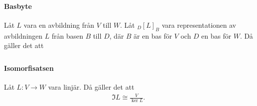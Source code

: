 \paragraph{Basbyte}
Låt $L$ vara en avbildning från $V$ till $W$. Låt $_{D}[L]_{B}$ vara representationen av avbildningen $L$ från basen $B$ till $D$, där $B$ är en bas för $V$ och $D$ en bas för $W$. Då gäller det att
\begin{align*}
	
\end{align*}

\paragraph{Isomorfisatsen}
Låt $L: V\to W$ vara linjär. Då gäller det att
\begin{align*}
	\Im{L} \cong \frac{V}{\ker{L}}.
\end{align*}
